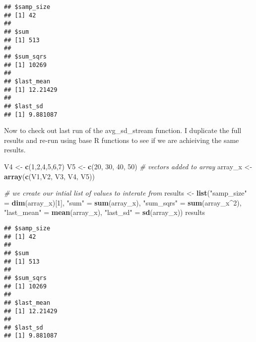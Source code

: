 \documentclass[]{article}
\newenvironment{Shaded}{\begin{snugshade}}{\end{snugshade}}
\newcommand{\KeywordTok}[1]{\textcolor[rgb]{0.13,0.29,0.53}{\textbf{{#1}}}}
\newcommand{\DecValTok}[1]{\textcolor[rgb]{0.00,0.00,0.81}{{#1}}}
\newcommand{\StringTok}[1]{\textcolor[rgb]{0.31,0.60,0.02}{{#1}}}
\newcommand{\CommentTok}[1]{\textcolor[rgb]{0.56,0.35,0.01}{\textit{{#1}}}}
\newcommand{\NormalTok}[1]{{#1}}
\begin{document}
\begin{verbatim}
## $samp_size
## [1] 42
## 
## $sum
## [1] 513
## 
## $sum_sqrs
## [1] 10269
## 
## $last_mean
## [1] 12.21429
## 
## $last_sd
## [1] 9.881087
\end{verbatim}

\newpage

Now to check out last run of the avg\_sd\_stream function. I duplicate
the full results and re-run using base R functions to see if we are
achieiving the same results.

\begin{Shaded}
\begin{Highlighting}[]
\NormalTok{V4 <-}\StringTok{ }\KeywordTok{c}\NormalTok{(}\DecValTok{1}\NormalTok{,}\DecValTok{2}\NormalTok{,}\DecValTok{4}\NormalTok{,}\DecValTok{5}\NormalTok{,}\DecValTok{6}\NormalTok{,}\DecValTok{7}\NormalTok{)}
\NormalTok{V5 <-}\StringTok{ }\KeywordTok{c}\NormalTok{(}\DecValTok{20}\NormalTok{, }\DecValTok{30}\NormalTok{, }\DecValTok{40}\NormalTok{, }\DecValTok{50}\NormalTok{)}
\CommentTok{# vectors added to array}
\NormalTok{array_x <-}\StringTok{ }\KeywordTok{array}\NormalTok{(}\KeywordTok{c}\NormalTok{(V1,V2, V3, V4, V5))}

\CommentTok{# we create our intial list of values to interate from}
\NormalTok{results <-}\StringTok{ }\KeywordTok{list}\NormalTok{(}\StringTok{"samp_size"} \NormalTok{=}\StringTok{ }\KeywordTok{dim}\NormalTok{(array_x)[}\DecValTok{1}\NormalTok{], }
                \StringTok{"sum"} \NormalTok{=}\StringTok{ }\KeywordTok{sum}\NormalTok{(array_x), }
                \StringTok{"sum_sqrs"} \NormalTok{=}\StringTok{ }\KeywordTok{sum}\NormalTok{(array_x^}\DecValTok{2}\NormalTok{), }
                \StringTok{"last_mean"} \NormalTok{=}\StringTok{ }\KeywordTok{mean}\NormalTok{(array_x),}
                \StringTok{"last_sd"} \NormalTok{=}\StringTok{ }\KeywordTok{sd}\NormalTok{(array_x))}
\NormalTok{results}
\end{Highlighting}
\end{Shaded}

\begin{verbatim}
## $samp_size
## [1] 42
## 
## $sum
## [1] 513
## 
## $sum_sqrs
## [1] 10269
## 
## $last_mean
## [1] 12.21429
## 
## $last_sd
## [1] 9.881087
\end{verbatim}
\end{document}
